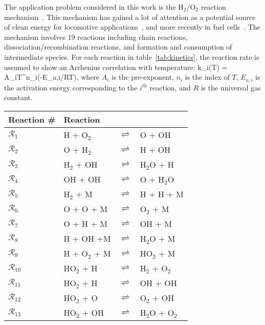 The application problem considered in this work is the
H$_2$/O$_2$ reaction mechanism~\cite{Yetter:1991}. This mechanism has gained
a lot of attention as a potential source of clean energy for
locomotive applications~\cite{Das:1996}, and more recently in fuel cells~\cite{Loges:2008}. 
The mechanism involves 19
reactions including chain reactions, dissociation/recombination reactions, and
formation and consumption of intermediate species. For each reaction in
table~\ref{tab:kinetics}, the reaction rate is assumed to show an Arrhenius
correlation with temperature:
%
\be
k_i(T) = A_iT^{n_i}\exp(-E_{a,i}/RT), 
\label{eq:rate}
\ee
%
where $A_i$ is the pre-exponent, $n_i$ is the index of $T$, $E_{a,i}$ is the
activation energy corresponding to the $i^{th}$ reaction, and $R$ is the
universal gas constant.  

\begin{table}[htbp]
\renewcommand*{\arraystretch}{0.9}
\begin{center}
\begin{tabular}{llll}
\toprule
Reaction \#     & Reaction &&\\
\bottomrule
$\mathcal{R}_1$ & H + O$_2$          & $\rightleftharpoons$ & O + OH \\
$\mathcal{R}_2$ & O + H$_2$          & $\rightleftharpoons$ & H + OH \\
$\mathcal{R}_3$ & H$_2$ + OH         & $\rightleftharpoons$ & H$_2$O + H \\
$\mathcal{R}_4$ & OH + OH            & $\rightleftharpoons$ & O + H$_2$O \\
$\mathcal{R}_5$ & H$_2$ + M          & $\rightleftharpoons$ & H + H + M \\
$\mathcal{R}_6$ & O + O + M          & $\rightleftharpoons$ & O$_2$ + M \\
$\mathcal{R}_7$ & O + H + M          & $\rightleftharpoons$ & OH + M \\
$\mathcal{R}_8$ & H + OH +M          & $\rightleftharpoons$ & H$_2$O + M \\
$\mathcal{R}_9$ & H + O$_2$ + M      & $\rightleftharpoons$ & HO$_2$ + M \\
$\mathcal{R}_{10}$ & HO$_2$ + H      & $\rightleftharpoons$ & H$_2$ + O$_2$ \\
$\mathcal{R}_{11}$ & HO$_2$ + H      & $\rightleftharpoons$ & OH + OH \\
$\mathcal{R}_{12}$ & HO$_2$ + O      & $\rightleftharpoons$ & O$_2$ + OH \\
$\mathcal{R}_{13}$ & HO$_2$ + OH     & $\rightleftharpoons$ & H$_2$O + O$_2$ \\

\end{tabular}
\end{center}
\end{table}
